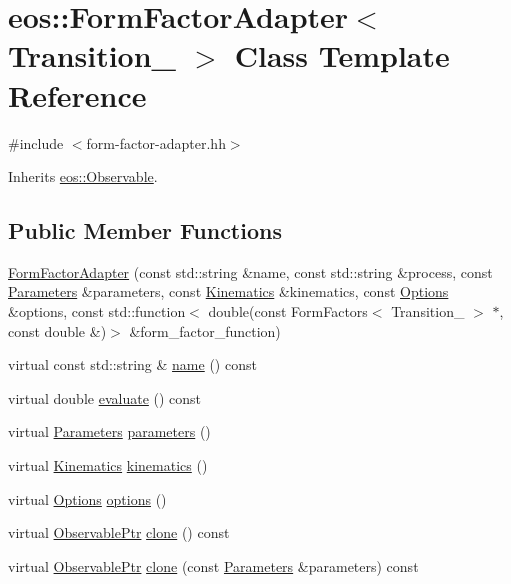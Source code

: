 \hypertarget{classeos_1_1FormFactorAdapter}{
\section{eos::FormFactorAdapter$<$ Transition\_\- $>$ Class Template Reference}
\label{classeos_1_1FormFactorAdapter}
}


{\ttfamily \#include $<$form-\/factor-\/adapter.hh$>$}

Inherits \hyperlink{classeos_1_1Observable}{eos::Observable}.\subsection*{Public Member Functions}
\begin{DoxyCompactItemize}
\item 
\hyperlink{classeos_1_1FormFactorAdapter_a8f300120959a3cbeff31894f2b2fb96c}{FormFactorAdapter} (const std::string \&name, const std::string \&process, const \hyperlink{classeos_1_1Parameters}{Parameters} \&parameters, const \hyperlink{classeos_1_1Kinematics}{Kinematics} \&kinematics, const \hyperlink{classeos_1_1Options}{Options} \&options, const std::function$<$ double(const FormFactors$<$ Transition\_\- $>$ $\ast$, const double \&)$>$ \&form\_\-factor\_\-function)
\item 
virtual const std::string \& \hyperlink{classeos_1_1FormFactorAdapter_ad4b0b6158fcbbdafeae6d62a2326ac92}{name} () const 
\item 
virtual double \hyperlink{classeos_1_1FormFactorAdapter_ad14dd267ae5fcbe9b739d438904ce959}{evaluate} () const 
\item 
virtual \hyperlink{classeos_1_1Parameters}{Parameters} \hyperlink{classeos_1_1FormFactorAdapter_aa1505da65e397bdda2e59ecfd49e375d}{parameters} ()
\item 
virtual \hyperlink{classeos_1_1Kinematics}{Kinematics} \hyperlink{classeos_1_1FormFactorAdapter_ae4fc137cd1c8b5703ffd6986e9ce739b}{kinematics} ()
\item 
virtual \hyperlink{classeos_1_1Options}{Options} \hyperlink{classeos_1_1FormFactorAdapter_a758693e9a8fff947fe1500796f1bda4e}{options} ()
\item 
virtual \hyperlink{namespaceeos_a470e5dd806bd129080f1aa0c2954646f}{ObservablePtr} \hyperlink{classeos_1_1FormFactorAdapter_a85c062dbc8dd32bb25299fbab92110f5}{clone} () const 
\item 
virtual \hyperlink{namespaceeos_a470e5dd806bd129080f1aa0c2954646f}{ObservablePtr} \hyperlink{classeos_1_1FormFactorAdapter_a94fdbd805aef594f074e6999616505b5}{clone} (const \hyperlink{classeos_1_1Parameters}{Parameters} \&parameters) const 
\end{DoxyCompactItemize}
